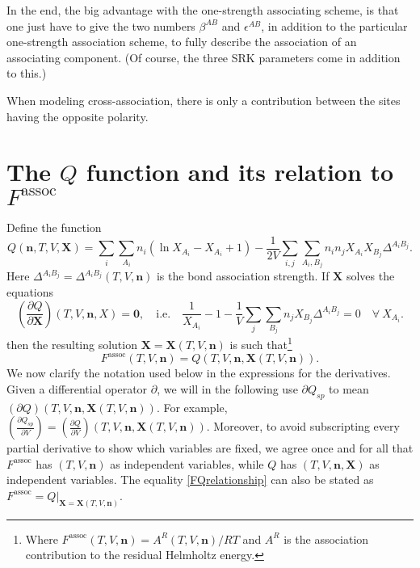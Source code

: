 \documentclass[english]{../thermomemo/thermomemo}
\newcommand{\mbf}[0]{\mathbf}
\newcommand*{\pder}[2]{\left(\frac{\partial #1}{\partial #2}\right)}
\newcommand{\lp}{\left(}
\newcommand{\rp}{\right)}
\begin{document}
In the end, the big advantage with the one-strength associating scheme, is that one just have to give the two numbers $\beta^{A B}$ and $\epsilon^{A B}$, in addition to the particular one-strength association scheme, to fully describe the association of an associating component. (Of course, the three SRK parameters come in addition to this.)

When modeling cross-association, there is only a contribution between the sites having the opposite polarity.

\section{The $Q$ function and its relation to $F^{\text{assoc}}$}
Define the function
\begin{equation}
  Q(\mbf n,T,V,\mathbf{X}) = \sum_i \sum_{A_i} n_i \lp \ln X_{A_i} - X_{A_i} + 1\rp - \frac{1}{2V} \sum_{i,j} \sum_{A_i, B_j} n_i n_j X_{A_i} X_{B_j} \Delta^{A_i B_j}.
\end{equation}
Here $\Delta^{A_i B_j} = \Delta^{A_i B_j}(T,V,\mbf n)$ is the bond association strength. If $\mbf X$ solves the equations
\begin{equation}
  \pder{Q}{\mbf X}(T,V,\mbf n,X) = \mbf 0, \quad \text{i.e.} \quad   \frac{1}{X_{A_i}} - 1 - \frac{1}{V} \sum_j \sum_{B_j} n_j X_{B_j} \Delta^{A_i B_j} = 0 \quad \forall \ X_{A_i}.
\end{equation}
then the resulting solution $\mbf X = \mbf X(T,V,\mbf n)$ is such that\footnote{Where $F^{\text{assoc}}(T,V,\mbf n) = A^{R}(T,V,\mbf n)/RT$ and $A^R$ is the association contribution to the residual Helmholtz energy.}
\begin{equation}
  \label{FQrelationship}
  F^{\text{assoc}}(T,V,\mbf n) = Q(T,V,\mbf n, \mbf X(T,V,\mbf n)).
\end{equation}
We now clarify the notation used below in the expressions for the derivatives. Given a differential operator $\partial$, we will in the following use $\partial Q_{sp}$ to mean $(\partial Q)(T,V,\mbf n,\mbf X(T,V,\mbf n))$. For example, $\pder{Q_{sp}}{V} = \pder{Q}{V}(T,V,\mbf n,\mbf X(T,V,\mbf n))$. Moreover, to avoid subscripting every partial derivative to show which variables are fixed, we agree once and for all that $F^{\text{assoc}}$ has $(T,V,\mbf n)$ as independent variables, while $Q$ has $(T,V,\mbf n,\mbf X)$ as independent variables. The equality \eqref{FQrelationship} can also be stated as $F^{\text{assoc}} = Q|_{\mbf X = \mbf X(T,V,\mbf n)}$.
\end{document}
